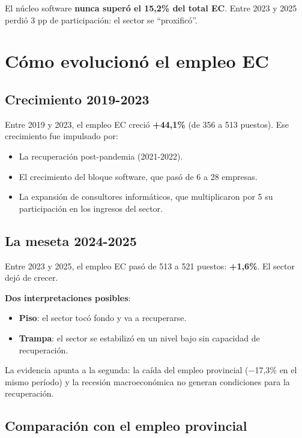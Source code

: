 \documentclass[
  spanish,
  letterpaper,
  DIV=11,
  numbers=noendperiod]{scrartcl}
\providecommand{\tightlist}{%
  \setlength{\itemsep}{0pt}\setlength{\parskip}{0pt}}
\begin{document}
El núcleo software \textbf{nunca superó el 15,2\% del total EC}. Entre
2023 y 2025 perdió 3 pp de participación: el sector se ``proxificó''.

\section{Cómo evolucionó el empleo EC}\label{sec-evolucion}

\subsection{Crecimiento 2019-2023}\label{crecimiento-2019-2023}

Entre 2019 y 2023, el empleo EC creció \textbf{+44,1\%} (de 356 a 513
puestos). Ese crecimiento fue impulsado por:

\begin{itemize}
\tightlist
\item
  La recuperación post-pandemia (2021-2022).
\item
  El crecimiento del bloque software, que pasó de 6 a 28 empresas.
\item
  La expansión de consultores informáticos, que multiplicaron por 5 su
  participación en los ingresos del sector.
\end{itemize}

\subsection{La meseta 2024-2025}\label{la-meseta-2024-2025}

Entre 2023 y 2025, el empleo EC pasó de 513 a 521 puestos:
\textbf{+1,6\%}. El sector dejó de crecer.

\textbf{Dos interpretaciones posibles}:

\begin{itemize}
\tightlist
\item
  \textbf{Piso}: el sector tocó fondo y va a recuperarse.
\item
  \textbf{Trampa}: el sector se estabilizó en un nivel bajo sin
  capacidad de recuperación.
\end{itemize}

La evidencia apunta a la segunda: la caída del empleo provincial
(−17,3\% en el mismo período) y la recesión macroeconómica no generan
condiciones para la recuperación.

\subsection{Comparación con el empleo
provincial}\label{comparaciuxf3n-con-el-empleo-provincial}
\end{document}
